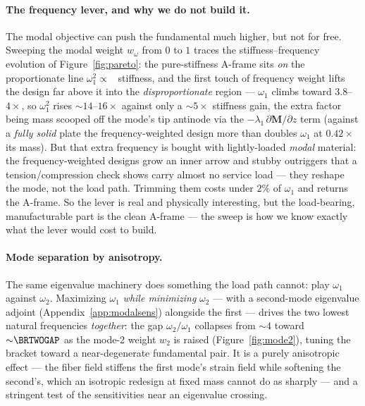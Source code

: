 \documentclass[11pt]{article}
\begin{document}
\paragraph{The frequency lever, and why we do not build it.} The modal objective can push
the fundamental much higher, but not for free. Sweeping the modal weight $w_\omega$ from
$0$ to $1$ traces the stiffness--frequency evolution of Figure~\ref{fig:pareto}: the
pure-stiffness A-frame sits \emph{on} the proportionate line $\omega_1^2\!\propto\!$~
stiffness, and the first touch of frequency weight lifts the design far above it into the
\emph{disproportionate} region --- $\omega_1$ climbs toward $3.8$--$4\times$, so
$\omega_1^2$ rises ${\sim}14$--$16\times$ against only a ${\sim}5\times$ stiffness gain,
the extra factor being mass scooped off the mode's tip antinode via the
$-\lambda_1\,\partial\mathbf M/\partial z$ term (against a \emph{fully solid} plate the
frequency-weighted design more than doubles $\omega_1$ at $0.42\times$ its mass). But that
extra frequency is bought with lightly-loaded \emph{modal} material: the frequency-weighted
designs grow an inner arrow and stubby outriggers that a tension/compression check shows
carry almost no service load --- they reshape the mode, not the load path. Trimming them
costs under $2\%$ of $\omega_1$ and returns the A-frame. So the lever is real and
physically interesting, but the load-bearing, manufacturable part is the clean A-frame ---
the sweep is how we know exactly what the lever would cost to build.

\paragraph{Mode separation by anisotropy.} The same eigenvalue machinery does something
the load path cannot: play $\omega_1$ against $\omega_2$. Maximizing $\omega_1$ \emph{while
minimizing} $\omega_2$ --- with a second-mode eigenvalue adjoint (Appendix~\ref{app:modalsens})
alongside the first --- drives the two lowest natural frequencies \emph{together}: the gap
$\omega_2/\omega_1$ collapses from ${\sim}4$ toward ${\sim}\BRTWOGAP$ as the mode-2 weight
$w_2$ is raised (Figure~\ref{fig:mode2}), tuning the bracket toward a near-degenerate
fundamental pair. It is a purely anisotropic effect --- the fiber field stiffens the first
mode's strain field while softening the second's, which an isotropic redesign at fixed
mass cannot do as sharply --- and a stringent test of the sensitivities near an eigenvalue
crossing.
\end{document}
